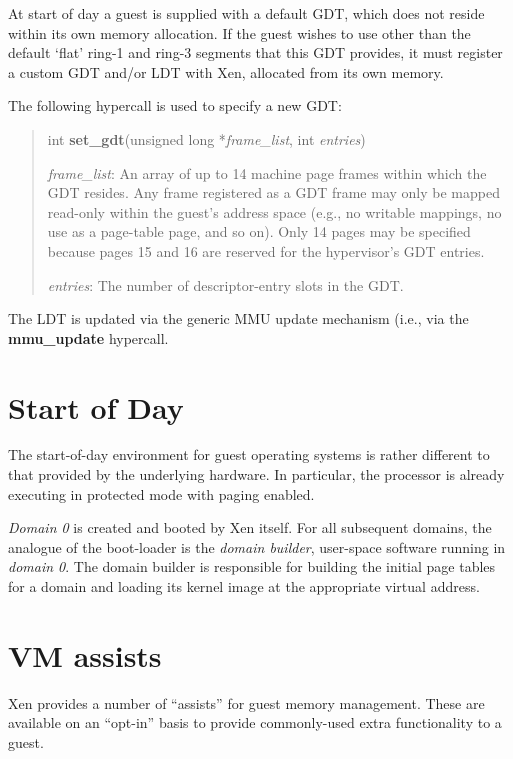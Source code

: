\documentclass[11pt,twoside,final,openright]{report}
\begin{document}
At start of day a guest is supplied with a default GDT, which does not reside
within its own memory allocation.  If the guest wishes to use other
than the default `flat' ring-1 and ring-3 segments that this GDT
provides, it must register a custom GDT and/or LDT with Xen, allocated
from its own memory.

The following hypercall is used to specify a new GDT:

\begin{quote}
  int {\bf set\_gdt}(unsigned long *{\em frame\_list}, int {\em
    entries})

  \emph{frame\_list}: An array of up to 14 machine page frames within
  which the GDT resides.  Any frame registered as a GDT frame may only
  be mapped read-only within the guest's address space (e.g., no
  writable mappings, no use as a page-table page, and so on). Only 14
  pages may be specified because pages 15 and 16 are reserved for
  the hypervisor's GDT entries.

  \emph{entries}: The number of descriptor-entry slots in the GDT.
\end{quote}

The LDT is updated via the generic MMU update mechanism (i.e., via the
{\bf mmu\_update} hypercall.

\section{Start of Day}

The start-of-day environment for guest operating systems is rather
different to that provided by the underlying hardware. In particular,
the processor is already executing in protected mode with paging
enabled.

{\it Domain 0} is created and booted by Xen itself. For all subsequent
domains, the analogue of the boot-loader is the {\it domain builder},
user-space software running in {\it domain 0}. The domain builder is
responsible for building the initial page tables for a domain and
loading its kernel image at the appropriate virtual address.

\section{VM assists}

Xen provides a number of ``assists'' for guest memory management.
These are available on an ``opt-in'' basis to provide commonly-used
extra functionality to a guest.
\end{document}
